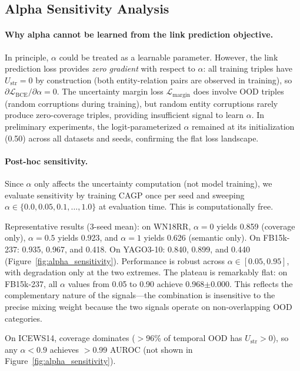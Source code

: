 \documentclass{article}
\begin{document}
\subsection{Alpha Sensitivity Analysis}
\label{app:alpha_sensitivity}

\paragraph{Why alpha cannot be learned from the link prediction objective.}
In principle, $\alpha$ could be treated as a learnable parameter. However, the link prediction loss provides \emph{zero gradient} with respect to $\alpha$: all training triples have $U_{\text{str}} = 0$ by construction (both entity-relation pairs are observed in training), so $\partial \mathcal{L}_{\text{BCE}} / \partial \alpha = 0$. The uncertainty margin loss $\mathcal{L}_{\text{margin}}$ does involve OOD triples (random corruptions during training), but random entity corruptions rarely produce zero-coverage triples, providing insufficient signal to learn $\alpha$. In preliminary experiments, the logit-parameterized $\alpha$ remained at its initialization (0.50) across all datasets and seeds, confirming the flat loss landscape.

\paragraph{Post-hoc sensitivity.}
Since $\alpha$ only affects the uncertainty computation (not model training), we evaluate sensitivity by training CAGP once per seed and sweeping $\alpha \in \{0.0, 0.05, 0.1, \ldots, 1.0\}$ at evaluation time. This is computationally free.

Representative results (3-seed mean): on WN18RR, $\alpha{=}0$ yields 0.859 (coverage only), $\alpha{=}0.5$ yields 0.923, and $\alpha{=}1$ yields 0.626 (semantic only). On FB15k-237: 0.935, 0.967, and 0.418. On YAGO3-10: 0.840, 0.899, and 0.440 (Figure~\ref{fig:alpha_sensitivity}). Performance is robust across $\alpha \in [0.05, 0.95]$, with degradation only at the two extremes. The plateau is remarkably flat: on FB15k-237, all $\alpha$ values from 0.05 to 0.90 achieve 0.968$\pm$0.000. This reflects the complementary nature of the signals---the combination is insensitive to the precise mixing weight because the two signals operate on non-overlapping OOD categories.

On ICEWS14, coverage dominates ($>$96\% of temporal OOD has $U_{\text{str}} > 0$), so any $\alpha < 0.9$ achieves $>$0.99 AUROC (not shown in Figure~\ref{fig:alpha_sensitivity}).
\end{document}
